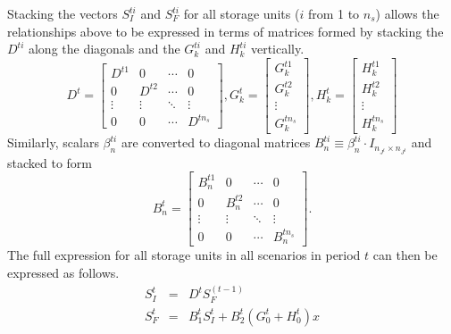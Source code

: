 \documentclass[12pt]{article}
\numberwithin{equation}{section}
\numberwithin{table}{section}
\numberwithin{figure}{section}
\begin{document}
Stacking the vectors $S_I^{ti}$ and $S_F^{ti}$ for all storage units ($i$ from 1 to $n_s$) allows the relationships above to be expressed in terms of matrices formed by stacking the $D^{ti}$ along the diagonals and the $G_k^{ti}$ and $H_k^{ti}$ vertically.
\begin{equation}
D^t = \left[ \begin{array}{cccc} D^{t1} & 0 & \cdots & 0 \\
 0 & D^{t2} & \cdots & 0 \\
 \vdots & \vdots & \ddots & \vdots \\
 0 &  0 & \cdots & D^{tn_s}
\end{array}
\right],
G_k^t = \left[ \begin{array}{c} G_k^{t1} \\
 G_k^{t2} \\
 \vdots \\
 G_k^{tn_s}
\end{array}
\right],
H_k^t = \left[ \begin{array}{c} H_k^{t1} \\
 H_k^{t2} \\
 \vdots \\
 H_k^{tn_s}
\end{array}
\right]
\end{equation}
Similarly, scalars $\beta_n^{ti}$ are converted to diagonal matrices $B_n^{ti} \equiv \beta_n^{ti} \cdot I_{n_{J^t} \times n_{J^t}}$ and stacked to form
\begin{equation}
B_n^t = \left[ \begin{array}{cccc} B_n^{t1} & 0 & \cdots & 0 \\
 0 & B_n^{t2} & \cdots & 0 \\
 \vdots & \vdots & \ddots & \vdots \\
 0 &  0 & \cdots & B_n^{tn_s}
\end{array}
\right].
\end{equation}
The full expression for all storage units in all scenarios in period $t$ can then be expressed as follows.
\begin{eqnarray}
S_I^t &=& D^t S_F^{(t-1)} \label{eq:siall} \\
S_F^t &=& B_1^t S_I^t + B_2^t (G_0^t + H_0^t) x \label{eq:sfall}
\end{eqnarray}
\end{document}
